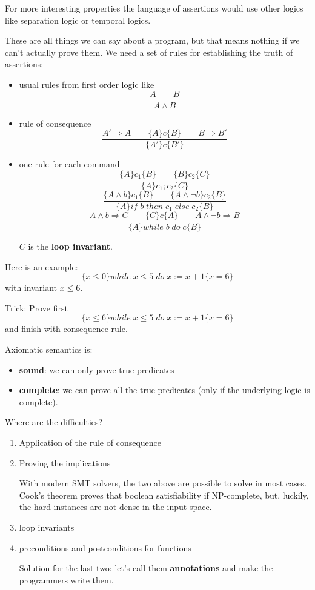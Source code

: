 \documentclass[12pt]{article}
\begin{document}
For more interesting properties the language of assertions would use other logics like separation logic or temporal logics.

These are all things we can say about a program, but that means nothing if we can't actually prove them. We need a set of rules for establishing the truth of assertions:
\begin{itemize}
\item usual rules from first order logic like 
\[
\frac{A \qquad B}{A \wedge B}
\]
\item rule of consequence
\[
\frac{A'\Rightarrow A \qquad \{A\}c\{B\} \qquad B \Rightarrow B'} { \{A'\}c\{B'\}}
\]
\item one rule for each command
\[
\frac{\{A\}c_1\{B\} \qquad \{B\}c_2\{C\}}{\{A\}c_1;c_2\{C\}}
\]
\[
\frac{ \{A \wedge b \}c_1 \{B\} \qquad \{A \wedge \neg b \} c_2 \{B\} }{\{A\}if\;b\;then\;c_1\;else\;c_2\{B\}}
\]
\[
\frac{ A \wedge b \Rightarrow C \qquad \{C\}c\{A\} \qquad A \wedge \neg b \Rightarrow B }{ \{A\}while\;b\;do\;c\{B\}}
\]

$C$ is the \textbf{loop invariant}.
\end{itemize}

Here is an example:
\[
\{x \leq 0\} while \; x \leq 5 \; do \; x := x + 1 \{ x = 6 \}
\]
with invariant $x \leq 6$.

Trick: Prove first 
\[
\{x \leq 6\} while \; x \leq 5 \; do \; x := x + 1 \{ x = 6 \}
\] and finish with consequence rule.

Axiomatic semantics is: 
\begin{itemize}
\item\textbf{sound}: we can only prove true predicates 
\item \textbf{complete}: we can prove all the true predicates (only if the underlying logic is complete). 
\end{itemize}

Where are the difficulties?
\begin{enumerate}
\item Application of the rule of consequence 
\item Proving the implications 

With modern SMT solvers, the two above are possible to solve in most cases. Cook's theorem proves that boolean satisfiability if NP-complete, but, luckily, the hard instances are not dense in the input space. 

\item loop invariants 
\item preconditions and postconditions for functions

Solution for the last two: let's call them \textbf{annotations} and make the programmers write them. 
\end{enumerate}
\end{document}
